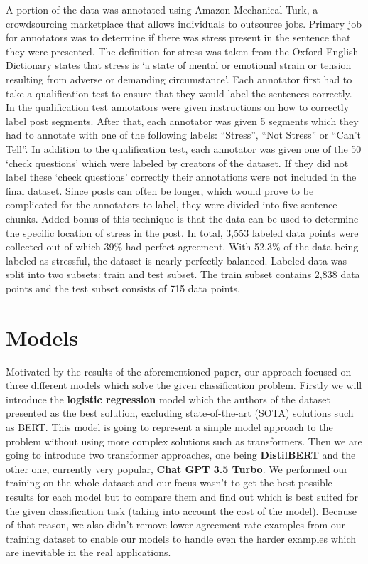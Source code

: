 \documentclass[10pt, a4paper]{article}
\begin{document}
A portion of the data was annotated using Amazon Mechanical Turk, a crowdsourcing marketplace that allows individuals to outsource jobs.
\hfill \break
\hfill \break
Primary job for annotators was to determine if there was stress present in the sentence that they were presented.
The definition for stress was taken from the Oxford English Dictionary states that stress is `a state of mental or emotional strain or tension resulting from adverse or demanding circumstance'.
Each annotator first had to take a qualification test to ensure that they would label the sentences correctly.
In the qualification test annotators were given instructions on how to correctly label post segments.
After that, each annotator was given 5 segments which they had to annotate with one of the following labels: ``Stress'', ``Not Stress'' or ``Can't Tell''.
In addition to the qualification test, each annotator was given one of the 50 `check questions' which were labeled by creators of the dataset.
If they did not label these `check questions' correctly their annotations were not included in the final dataset.
Since posts can often be longer, which would prove to be complicated for the annotators to label, they were divided into five-sentence chunks.
Added bonus of this technique is that the data can be used to determine the specific location of stress in the post.
\hfill \break
\hfill \break
In total, 3,553 labeled data points were collected out of which 39\% had perfect agreement.
With 52.3\% of the data being labeled as stressful, the dataset is nearly perfectly balanced.
Labeled data was split into two subsets: train and test subset.
The train subset contains 2,838 data points and the test subset consists of 715 data points.

\section{Models}
Motivated by the results of the aforementioned paper, our approach focused on three different models which solve the given classification problem.
\hfill \break
\hfill \break
Firstly we will introduce the \textbf{logistic regression} model which the authors of the dataset presented as the best solution, excluding state-of-the-art (SOTA) solutions such as BERT.
This model is going to represent a simple model approach to the problem without using more complex solutions such as transformers.
Then we are going to introduce two transformer approaches, one being \textbf{DistilBERT} and the other one, currently very popular, \textbf{Chat GPT 3.5 Turbo}.
\hfill \break
\hfill \break
We performed our training on the whole dataset and our focus wasn't to get the best possible results for each model but to compare them and find out which is best suited for the given classification task (taking into account the cost of the model).
Because of that reason, we also didn't remove lower agreement rate examples from our training dataset to enable our models to handle even the harder examples which are inevitable in the real applications.
\end{document}
